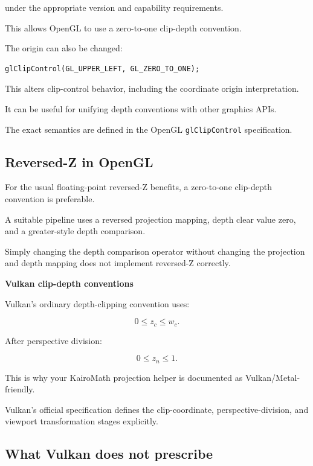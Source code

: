 under the appropriate version and capability requirements.

This allows OpenGL to use a zero-to-one clip-depth convention.

The origin can also be changed:

\begin{verbatim}
glClipControl(GL_UPPER_LEFT, GL_ZERO_TO_ONE);
\end{verbatim}

This alters clip-control behavior, including the coordinate origin interpretation.

It can be useful for unifying depth conventions with other graphics APIs.

The exact semantics are defined in the OpenGL \texttt{glClipControl} specification. 

\subsection{Reversed-Z in OpenGL}\label{02-foundations-ii-ch033-reversed-z-in-opengl}

\hypertarget{02-foundations-ii-ch033-reversed-z-in-opengl}{}

For the usual floating-point reversed-Z benefits, a zero-to-one clip-depth convention is preferable.

A suitable pipeline uses a reversed projection mapping, depth clear value zero, and a greater-style depth comparison.

Simply changing the depth comparison operator without changing the projection and depth mapping does not implement reversed-Z correctly.

\textbf{Vulkan clip-depth conventions}

Vulkan's ordinary depth-clipping convention uses:

\[
 \boxed{ 0\le z_c\le w_c }.
\]

After perspective division:

\[
 \boxed{ 0\le z_n\le1 }.
\]

This is why your KairoMath projection helper is documented as Vulkan/Metal-friendly.

Vulkan's official specification defines the clip-coordinate, perspective-division, and viewport transformation stages explicitly. 

\subsection{What Vulkan does not prescribe}\label{02-foundations-ii-ch033-what-vulkan-does-not-prescribe}

